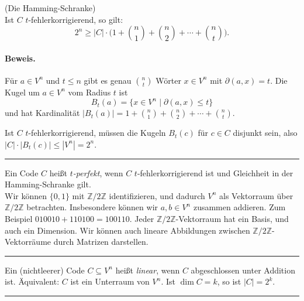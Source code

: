 \documentclass[9pt]{article}
\begin{document}
\begin{satz} (Die Hamming-Schranke) \\
Ist \(C\) \(t\)-fehlerkorrigierend, so gilt: 
\[
2^n \geq |C| \cdot \big(1 + \binom{n}{1} + \binom{n}{2} + \cdots + \binom{n}{t}\big).
\]

\paragraph{Beweis.}
Für \(a \in V^n\) und \(t \leq n\) gibt es genau \(\binom{n}{t}\) Wörter \(x \in V^n\) mit
\(\partial(a, x) = t\). Die Kugel um \(a \in V^n\) vom Radius \(t\) ist
\[
B_t(a) = \{x \in V^n \mid \partial(a, x) \leq t\}
\]
und hat Kardinalität \(|B_t(a)| = 1 + \binom{n}{1} + \binom{n}{2} + \cdots + \binom{n}{t}\).

Ist \(C\) \(t\)-fehlerkorrigierend, müssen die Kugeln \(B_t(c)\) für \(c \in C\) disjunkt
sein, also \(|C| \cdot |B_t(c)| \leq |V^n| = 2^n\).
 \end{satz} \noindent \rule{8cm}{0.4pt}

\begin{defi}
Ein Code \(C\) heißt \emph{\(t\)-perfekt}, wenn \(C\) \(t\)-fehlerkorrigierend
ist und Gleichheit in der Hamming-Schranke gilt. \\ \newline {}
Wir können $\{0, 1\}$ mit $\mathbb{Z}/2\mathbb{Z}$ identifizieren, und dadurch $V^n$ als Vektorraum über $\mathbb{Z}/2\mathbb{Z}$ betrachten. Insbesondere können wir $a, b \in V^n$ zusammen addieren. Zum Beispiel $010010 + 110100 = 100110$. Jeder $\mathbb{Z}/2\mathbb{Z}$-Vektorraum hat ein Basis, und auch ein Dimension. Wir können auch lineare Abbildungen zwischen $\mathbb{Z}/2\mathbb{Z}$-Vektorräume durch Matrizen darstellen.
\end{defi} \noindent \rule{8cm}{0.4pt}

\begin{defi}
Ein (nichtleerer) Code \(C \subseteq V^n\) heißt \emph{linear},  wenn \(C\) abgeschlossen unter Addition ist. Äquivalent: \(C\) ist ein Unterraum von \(V^n\). Ist \(\dim C = k\), so ist \(|C| = 2^k\).   
\end{defi} \noindent \rule{8cm}{0.4pt}
\end{document}
